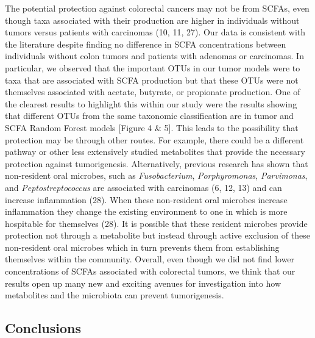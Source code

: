 \documentclass[11pt,]{article}
\begin{document}
The potential protection against colorectal cancers may not be from
SCFAs, even though taxa associated with their production are higher in
individuals without tumors versus patients with carcinomas (10, 11, 27).
Our data is consistent with the literature despite finding no difference
in SCFA concentrations between individuals without colon tumors and
patients with adenomas or carcinomas. In particular, we observed that
the important OTUs in our tumor models were to taxa that are associated
with SCFA production but that these OTUs were not themselves associated
with acetate, butyrate, or propionate production. One of the clearest
results to highlight this within our study were the results showing that
different OTUs from the same taxonomic classification are in tumor and
SCFA Random Forest models {[}Figure 4 \& 5{]}. This leads to the
possibility that protection may be through other routes. For example,
there could be a different pathway or other less extensively studied
metabolites that provide the necessary protection against tumorigenesis.
Alternatively, previous research has shown that non-resident oral
microbes, such as \emph{Fusobacterium}, \emph{Porphyromonas},
\emph{Parvimonas}, and \emph{Peptostreptococcus} are associated with
carcinomas (6, 12, 13) and can increase inflammation (28). When these
non-resident oral microbes increase inflammation they change the
existing environment to one in which is more hospitable for themselves
(28). It is possible that these resident microbes provide protection not
through a metabolite but instead through active exclusion of these
non-resident oral microbes which in turn prevents them from establishing
themselves within the community. Overall, even though we did not find
lower concentrations of SCFAs associated with colorectal tumors, we
think that our results open up many new and exciting avenues for
investigation into how metabolites and the microbiota can prevent
tumorigenesis.

\newpage

\subsection{Conclusions}\label{conclusions}
\end{document}
